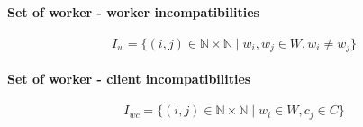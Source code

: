 \documentclass[../../thesis.tex]{subfiles}
\begin{document}
\paragraph{Set of worker - worker incompatibilities}

\begin{equation*}
    {I_{w} = \{ ({i},{j}) \in \mathbb{N} \times \mathbb{N} \mid w_i, w_j \in W, w_i \neq w_j \}}
\end{equation*}


\paragraph{Set of worker - client incompatibilities}
\begin{equation*}
    I_{wc} = \{ (i, j) \in \mathbb{N} \times \mathbb{N} \mid w_i \in W, c_j \in C \}
\end{equation*}
\end{document}
